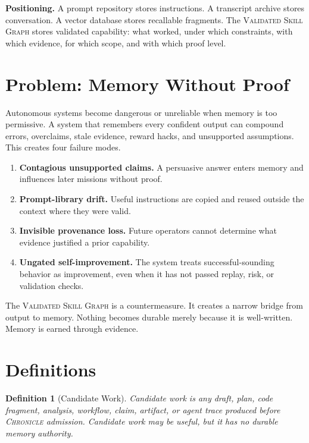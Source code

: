 \documentclass[10.5pt]{article}
\theoremstyle{goThm}
\newtheorem{definition}{Definition}
\newcommand{\vsg}{\textsc{Validated Skill Graph}}
\newcommand{\chronicle}{\textsc{Chronicle}}
\begin{document}
\begin{thesisbox}
\textbf{Positioning.} A prompt repository stores instructions. A transcript archive stores conversation. A vector database stores recallable fragments. The \vsg{} stores validated capability: what worked, under which constraints, with which evidence, for which scope, and with which proof level.
\end{thesisbox}

\section{Problem: Memory Without Proof}
Autonomous systems become dangerous or unreliable when memory is too permissive. A system that remembers every confident output can compound errors, overclaims, stale evidence, reward hacks, and unsupported assumptions. This creates four failure modes.

\begin{enumerate}[label=\textbf{F\arabic*.}]
  \item \textbf{Contagious unsupported claims.} A persuasive answer enters memory and influences later missions without proof.
  \item \textbf{Prompt-library drift.} Useful instructions are copied and reused outside the context where they were valid.
  \item \textbf{Invisible provenance loss.} Future operators cannot determine what evidence justified a prior capability.
  \item \textbf{Ungated self-improvement.} The system treats successful-sounding behavior as improvement, even when it has not passed replay, risk, or validation checks.
\end{enumerate}

The \vsg{} is a countermeasure. It creates a narrow bridge from output to memory. Nothing becomes durable merely because it is well-written. Memory is earned through evidence.

\section{Definitions}

\begin{definition}[Candidate Work]
Candidate work is any draft, plan, code fragment, analysis, workflow, claim, artifact, or agent trace produced before \chronicle{} admission. Candidate work may be useful, but it has no durable memory authority.
\end{definition}
\end{document}
